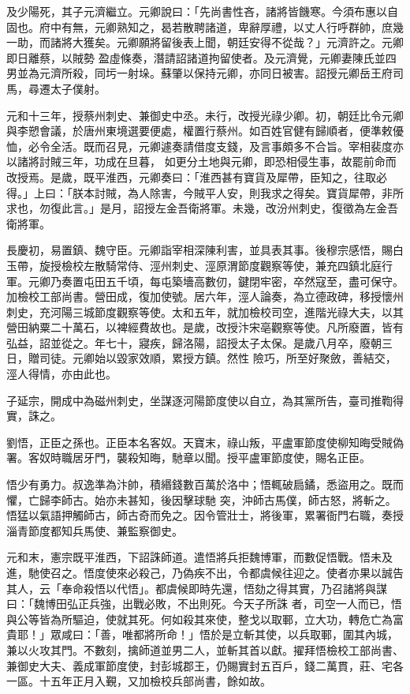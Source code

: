 \begin{pinyinscope}
 及少陽死，其子元濟繼立。元卿說曰：「先尚書性吝，諸將皆饑寒。今須布惠以自固也。府中有無，元卿熟知之，曷若散聘諸道，卑辭厚禮，以丈人行呼群帥，庶幾一助，而諸將大獲矣。元卿願將留後表上聞，朝廷安得不從哉？」元濟許之。元卿即日離蔡，以賊勢
 盈虛條奏，潛請詔諸道拘留使者。及元濟覺，元卿妻陳氏並四男並為元濟所殺，同圬一射垛。蘇肇以保持元卿，亦同日被害。詔授元卿岳王府司馬，尋遷太子僕射。



 元和十三年，授蔡州刺史、兼御史中丞。未行，改授光祿少卿。初，朝廷比令元卿與李愬會議，於唐州東境選要便處，權置行蔡州。如百姓官健有歸順者，便準敕優恤，必令全活。既而召見，元卿遽奏請借度支錢，及言事頗多不合旨。宰相裴度亦以諸將討賊三年，功成在旦暮，
 如更分土地與元卿，即恐相侵生事，故罷前命而改授焉。是歲，既平淮西，元卿奏曰：「淮西甚有寶貨及犀帶，臣知之，往取必得。」上曰：「朕本討賊，為人除害，今賊平人安，則我求之得矣。寶貨犀帶，非所求也，勿復此言。」是月，詔授左金吾衛將軍。未幾，改汾州刺史，復徵為左金吾衛將軍。



 長慶初，易置鎮、魏守臣。元卿詣宰相深陳利害，並具表其事。後穆宗感悟，賜白玉帶，旋授檢校左散騎常侍、涇州刺史、涇原渭節度觀察等使，兼充四鎮北庭行
 軍。元卿乃奏置屯田五千頃，每屯築墻高數仞，鍵閉牢密，卒然寇至，盡可保守。加檢校工部尚書。營田成，復加使號。居六年，涇人論奏，為立德政碑，移授懷州刺史，充河陽三城節度觀察等使。太和五年，就加檢校司空，進階光祿大夫，以其營田納粟二十萬石，以裨經費故也。是歲，改授汴宋亳觀察等使。凡所廢置，皆有弘益，詔並從之。年七十，寢疾，歸洛陽，詔授太子太保。是歲八月卒，廢朝三日，贈司徒。元卿始以毀家效順，累授方鎮。然性
 險巧，所至好聚斂，善結交，涇人得情，亦由此也。



 子延宗，開成中為磁州刺史，坐謀逐河陽節度使以自立，為其黨所告，臺司推鞫得實，誅之。



 劉悟，正臣之孫也。正臣本名客奴。天寶末，祿山叛，平盧軍節度使柳知晦受賊偽署。客奴時職居牙門，襲殺知晦，馳章以聞。授平盧軍節度使，賜名正臣。



 悟少有勇力。叔逸準為汴帥，積緡錢數百萬於洛中；悟輒破扃鐍，悉盜用之。既而懼，亡歸李師古。始亦未甚知，後因擊球馳
 突，沖師古馬僕，師古怒，將斬之。悟猛以氣語押觸師古，師古奇而免之。因令管壯士，將後軍，累署衙門右職，奏授淄青節度都知兵馬使、兼監察御史。



 元和末，憲宗既平淮西，下詔誅師道。遣悟將兵拒魏博軍，而數促悟戰。悟未及進，馳使召之。悟度使來必殺己，乃偽疾不出，令都虞候往迎之。使者亦果以誠告其人，云「奉命殺悟以代悟」。都虞候即時先還，悟劾之得其實，乃召諸將與謀曰：「魏博田弘正兵強，出戰必敗，不出則死。今天子所誅
 者，司空一人而已，悟與公等皆為所驅迫，使就其死。何如殺其來使，整戈以取鄆，立大功，轉危亡為富貴耶！」眾咸曰：「善，唯都將所命！」悟於是立斬其使，以兵取鄆，圍其內城，兼以火攻其門。不數刻，擒師道並男二人，並斬其首以獻。擢拜悟檢校工部尚書、兼御史大夫、義成軍節度使，封彭城郡王，仍賜實封五百戶，錢二萬貫，莊、宅各一區。十五年正月入覲，又加檢校兵部尚書，餘如故。




\end{pinyinscope}
